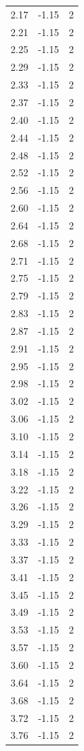 \begin{longtable}{lrr}
  2.17 & -1.15 & 2 \\
  2.21 & -1.15 & 2 \\
  2.25 & -1.15 & 2 \\
  2.29 & -1.15 & 2 \\
  2.33 & -1.15 & 2 \\
  2.37 & -1.15 & 2 \\
  2.40 & -1.15 & 2 \\
  2.44 & -1.15 & 2 \\
  2.48 & -1.15 & 2 \\
  2.52 & -1.15 & 2 \\
  2.56 & -1.15 & 2 \\
  2.60 & -1.15 & 2 \\
  2.64 & -1.15 & 2 \\
  2.68 & -1.15 & 2 \\
  2.71 & -1.15 & 2 \\
  2.75 & -1.15 & 2 \\
  2.79 & -1.15 & 2 \\
  2.83 & -1.15 & 2 \\
  2.87 & -1.15 & 2 \\
  2.91 & -1.15 & 2 \\
  2.95 & -1.15 & 2 \\
  2.98 & -1.15 & 2 \\
  3.02 & -1.15 & 2 \\
  3.06 & -1.15 & 2 \\
  3.10 & -1.15 & 2 \\
  3.14 & -1.15 & 2 \\
  3.18 & -1.15 & 2 \\
  3.22 & -1.15 & 2 \\
  3.26 & -1.15 & 2 \\
  3.29 & -1.15 & 2 \\
  3.33 & -1.15 & 2 \\
  3.37 & -1.15 & 2 \\
  3.41 & -1.15 & 2 \\
  3.45 & -1.15 & 2 \\
  3.49 & -1.15 & 2 \\
  3.53 & -1.15 & 2 \\
  3.57 & -1.15 & 2 \\
  3.60 & -1.15 & 2 \\
  3.64 & -1.15 & 2 \\
  3.68 & -1.15 & 2 \\
  3.72 & -1.15 & 2 \\
  3.76 & -1.15 & 2 \\

\end{longtable}

